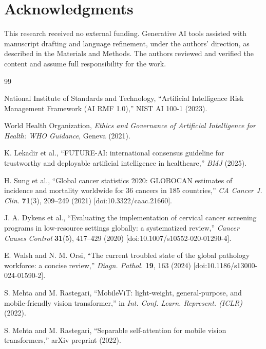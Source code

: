 \documentclass[12pt,letterpaper]{article}
\begin{document}
\section*{Acknowledgments}
This research received no external funding. Generative AI tools assisted with manuscript drafting and language refinement, under the authors' direction, as described in the Materials and Methods. The authors reviewed and verified the content and assume full responsibility for the work.

{\small
\begin{thebibliography}{99}\setlength{\itemsep}{0pt}

National Institute of Standards and Technology, ``Artificial Intelligence Risk Management Framework (AI RMF 1.0),'' NIST AI 100-1 (2023). %

World Health Organization, \textit{Ethics and Governance of Artificial Intelligence for Health: WHO Guidance}, Geneva (2021). %

K. Lekadir et al., ``FUTURE-AI: international consensus guideline for trustworthy and deployable artificial intelligence in healthcare,'' \textit{BMJ} (2025). %

H. Sung et al., ``Global cancer statistics 2020: GLOBOCAN estimates of incidence and mortality worldwide for 36 cancers in 185 countries,'' \textit{CA Cancer J. Clin.} \textbf{71}(3), 209--249 (2021) [doi:10.3322/caac.21660].

J. A. Dykens et al., ``Evaluating the implementation of cervical cancer screening programs in low-resource settings globally: a systematized review,'' \textit{Cancer Causes Control} \textbf{31}(5), 417--429 (2020) [doi:10.1007/s10552-020-01290-4].

E. Walsh and N. M. Orsi, ``The current troubled state of the global pathology workforce: a concise review,'' \textit{Diagn. Pathol.} \textbf{19}, 163 (2024) [doi:10.1186/s13000-024-01590-2].

S. Mehta and M. Rastegari, ``MobileViT: light-weight, general-purpose, and mobile-friendly vision transformer,'' in \textit{Int. Conf. Learn. Represent. (ICLR)} (2022).

S. Mehta and M. Rastegari, ``Separable self-attention for mobile vision transformers,'' arXiv preprint (2022).


\end{thebibliography}}
\end{document}
